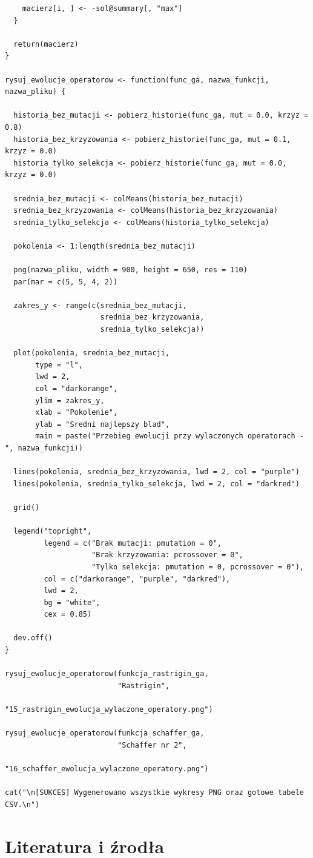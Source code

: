 \documentclass[a4paper,12pt]{article}
\begin{document}
\begin{lstlisting}
    macierz[i, ] <- -sol@summary[, "max"]
  }
  
  return(macierz)
}

rysuj_ewolucje_operatorow <- function(func_ga, nazwa_funkcji, nazwa_pliku) {
  
  historia_bez_mutacji <- pobierz_historie(func_ga, mut = 0.0, krzyz = 0.8)
  historia_bez_krzyzowania <- pobierz_historie(func_ga, mut = 0.1, krzyz = 0.0)
  historia_tylko_selekcja <- pobierz_historie(func_ga, mut = 0.0, krzyz = 0.0)
  
  srednia_bez_mutacji <- colMeans(historia_bez_mutacji)
  srednia_bez_krzyzowania <- colMeans(historia_bez_krzyzowania)
  srednia_tylko_selekcja <- colMeans(historia_tylko_selekcja)
  
  pokolenia <- 1:length(srednia_bez_mutacji)
  
  png(nazwa_pliku, width = 900, height = 650, res = 110)
  par(mar = c(5, 5, 4, 2))
  
  zakres_y <- range(c(srednia_bez_mutacji,
                      srednia_bez_krzyzowania,
                      srednia_tylko_selekcja))
  
  plot(pokolenia, srednia_bez_mutacji,
       type = "l",
       lwd = 2,
       col = "darkorange",
       ylim = zakres_y,
       xlab = "Pokolenie",
       ylab = "Sredni najlepszy blad",
       main = paste("Przebieg ewolucji przy wylaczonych operatorach -", nazwa_funkcji))
  
  lines(pokolenia, srednia_bez_krzyzowania, lwd = 2, col = "purple")
  lines(pokolenia, srednia_tylko_selekcja, lwd = 2, col = "darkred")
  
  grid()
  
  legend("topright",
         legend = c("Brak mutacji: pmutation = 0",
                    "Brak krzyzowania: pcrossover = 0",
                    "Tylko selekcja: pmutation = 0, pcrossover = 0"),
         col = c("darkorange", "purple", "darkred"),
         lwd = 2,
         bg = "white",
         cex = 0.85)
  
  dev.off()
}

rysuj_ewolucje_operatorow(funkcja_rastrigin_ga,
                          "Rastrigin",
                          "15_rastrigin_ewolucja_wylaczone_operatory.png")

rysuj_ewolucje_operatorow(funkcja_schaffer_ga,
                          "Schaffer nr 2",
                          "16_schaffer_ewolucja_wylaczone_operatory.png")

cat("\n[SUKCES] Wygenerowano wszystkie wykresy PNG oraz gotowe tabele CSV.\n")
\end{lstlisting}

\section{Literatura i źrodła}
\end{document}
